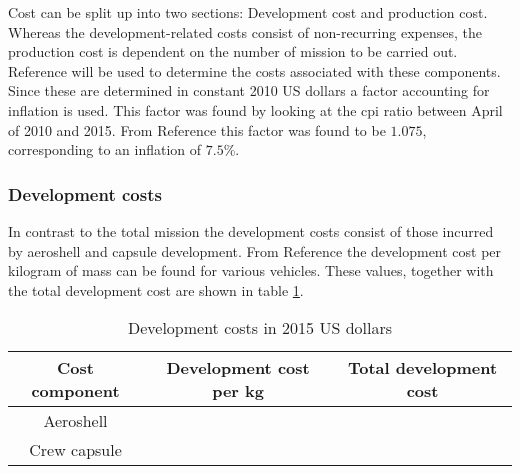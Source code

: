 Cost can be split up into two sections: Development cost and production cost. Whereas the development-related costs consist of non-recurring expenses, the production cost is dependent on the number of mission to be carried out. Reference \cite{Wertz2011} will be used to determine the costs associated with these components. Since these are determined in constant 2010 US dollars a factor accounting for inflation is used. This factor was found by looking at the \gls{cpi} ratio between April of 2010 and 2015. From Reference \cite{Crawford2015} this factor was found to be $1.075$, corresponding to an inflation of $7.5\%$.

\subsubsection{Development costs}
In contrast to the total mission the development costs consist of those incurred by aeroshell and capsule development. From Reference \cite{Wertz2011} the development cost per kilogram of mass can be found for various vehicles. These values, together with the total development cost are shown in table \ref{tab:devcosts}.

\begin{table}
	\centering
	\caption{Development costs in 2015 US dollars}
	\begin{tabular}{|c|c|c|}
		\hline
		\textbf{Cost component} & \textbf{Development cost per kg} & \textbf{Total development cost} \\ \hline \hline
		Aeroshell & & \\
		Crew capsule & & \\
	\end{tabular}
	\label{tab:devcosts}
\end{table}